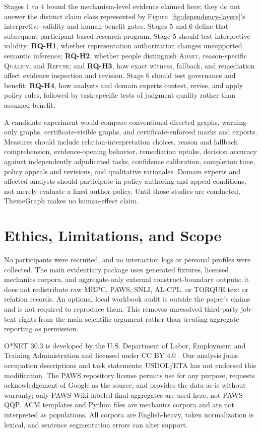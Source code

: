 \documentclass[manuscript,screen,review]{acmart}
\begin{document}
Stages 1 to 4 bound the mechanism-level evidence claimed here; they do not answer the distinct claim class represented by Figure~\ref{fig:dependency-layers}'s interpretive-validity and human-benefit gates. Stages 5 and 6 define that subsequent participant-based research program. Stage 5 should test interpretive validity: \textbf{RQ-H1}, whether representation authorization changes unsupported semantic inference; \textbf{RQ-H2}, whether people distinguish \textsc{Admit}, reason-specific \textsc{Qualify}, and \textsc{Refuse}; and \textbf{RQ-H3}, how exact witness, fallback, and remediation affect evidence inspection and revision. Stage 6 should test governance and benefit: \textbf{RQ-H4}, how analysts and domain experts contest, revise, and apply policy rules, followed by task-specific tests of judgment quality rather than assumed benefit.

A candidate experiment would compare conventional directed graphs, warning-only graphs, certificate-visible graphs, and certificate-enforced marks and exports. Measures should include relation-interpretation choices, reason and fallback comprehension, evidence-opening behavior, remediation uptake, decision accuracy against independently adjudicated tasks, confidence calibration, completion time, policy appeals and revisions, and qualitative rationales. Domain experts and affected analysts should participate in policy-authoring and appeal conditions, not merely evaluate a fixed author policy. Until those studies are conducted, ThemeGraph makes no human-effect claim.

\section{Ethics, Limitations, and Scope}

No participants were recruited, and no interaction logs or personal profiles were collected. The main evidentiary package uses generated fixtures, licensed mechanics corpora, and aggregate-only external construct-boundary outputs; it does not redistribute raw MRPC, PAWS, SNLI, AL-CPL, or TORQUE text or relation records. An optional local workbook audit is outside the paper's claims and is not required to reproduce them. This removes unresolved third-party job-text rights from the main scientific argument rather than treating aggregate reporting as permission.

O*NET 30.3 is developed by the U.S. Department of Labor, Employment and Training Administration and licensed under CC BY 4.0 \cite{onet303}. Our analysis joins occupation descriptions and task statements; USDOL/ETA has not endorsed this modification. The PAWS repository license permits use for any purpose, requests acknowledgement of Google as the source, and provides the data as-is without warranty; only PAWS-Wiki labeled-final aggregates are used here, not PAWS-QQP. ACM templates and Python files are mechanics corpora and are not interpreted as populations. All corpora are English-heavy, token normalization is lexical, and sentence segmentation errors can alter support.
\end{document}
